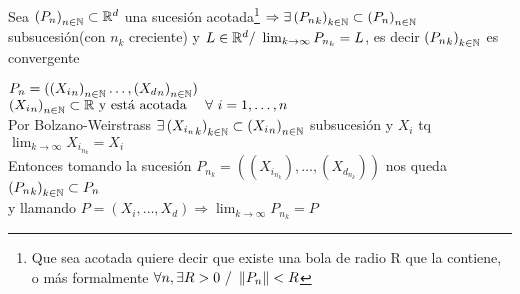 \documentclass[a4paper,10pt]{article}
\begin{document}
\fi
\hspace*{\fill} \\
\hspace*{\fill} \\
\teorema Sea $\defsucesion{P} \subset \rene[d]$ una sucesión acotada\footnote{Que sea acotada quiere decir que existe una bola de radio R que la contiene, o más formalmente $\forall n, \exists R > 0 \ / \ \norm{P_n} < R$} $\Rightarrow \exists \defsucesion[k]{P_n} \subset \defsucesion{P}$ subsucesión(con $n_k$ creciente) y $L \in \rene[d] / \ \lim_{k \to \infty} P_{n_k} = L$, es decir $\defsucesion[k]{P_n}$ es convergente
\ifversionlarga
\\
\begin{demo}
	$P_n = (\defsucesion{X_{i}} \dots,\defsucesion{X_d})$ \\
	$\defsucesion{X_{i}}\subset \mathbb{R} \mbox{ y está acotada } \ \ \ \forall \ i=1,\dots,n$ \\
	Por Bolzano-Weirstrass $\exists \defsucesion[k]{X_{i_{n}}} \subset \defsucesion{X_{i}}$ subsucesión y $X_i$ tq $\lim_{k \to \infty} X_{i_{n_k}} = X_i$ \\
	Entonces tomando la sucesión $P_{n_k} = ((X_{i_{n_k}}),\dots,(X_{d_{n_k}}))$ nos queda $\defsucesion[k]{P_{n}} \subset P_{n}$ \\
	y llamando $P = (X_i,\dots,X_d) \Rightarrow \lim_{k \to \infty}{P_{n_k}} = P$
\end{demo}
\clearpage 
\fi
\end{document}
